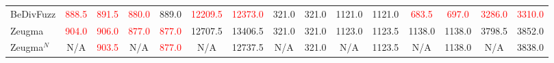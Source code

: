 \begin{table}[t]
\begin{tabular}{l|cc|cc|cc|cc|cc|cc|cc}
    BeDivFuzz & \textcolor{red}{888.5} & \textcolor{red}{891.5} & \textcolor{red}{880.0} & 889.0 & \textcolor{red}{12209.5} & \textcolor{red}{12373.0} & \cellcolor{blue!15}321.0 & \cellcolor{blue!15}321.0 & 1121.0 & 1121.0 & \textcolor{red}{683.5} & \textcolor{red}{697.0} & \textcolor{red}{3286.0} & \textcolor{red}{3310.0} \\
    Zeugma & \textcolor{red}{904.0} & \textcolor{red}{906.0} & \textcolor{red}{877.0} & \textcolor{red}{877.0} & \cellcolor{blue!15}\textcolor{\chigher}{12707.5} & \cellcolor{blue!15}\textcolor{\chigher}{13406.5} & \cellcolor{blue!15}321.0 & \cellcolor{blue!15}321.0 & \cellcolor{blue!15}\textcolor{\chigher}{1123.0} & \cellcolor{blue!15}\textcolor{\chigher}{1123.5} & \cellcolor{blue!15}\textcolor{\chigher}{1138.0} & \cellcolor{blue!15}1138.0 & \cellcolor{blue!15}\textcolor{\chigher}{3798.5} & \cellcolor{blue!15}\textcolor{\chigher}{3852.0} \\
    Zeugma$^{N}$ & N/A & \textcolor{red}{903.5} & N/A & \textcolor{red}{877.0} & N/A & \textcolor{\chigher}{12737.5} & N/A & 321.0 & N/A & \textcolor{\chigher}{1123.5} & N/A & 1138.0 & N/A & \textcolor{\chigher}{3838.0} \\
    \bottomrule
    \end{tabular}
\end{table}